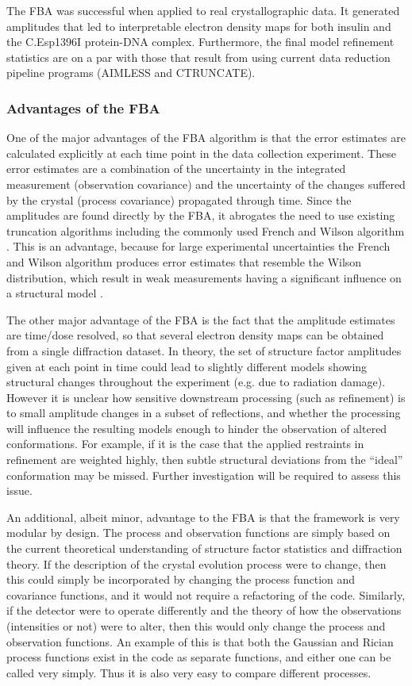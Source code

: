 The FBA was successful when applied to real crystallographic data.
It generated amplitudes that led to interpretable electron density maps for both insulin and the C.Esp1396I protein-DNA complex.
Furthermore, the final model refinement statistics are on a par with those that result from using current data reduction pipeline programs (AIMLESS and CTRUNCATE).

\subsubsection{Advantages of the FBA}
\label{subs:Advantages of the FBA}
One of the major advantages of the FBA algorithm is that the error estimates are calculated explicitly at each time point in the data collection experiment.
These error estimates are a combination of the uncertainty in the integrated measurement (observation covariance) and the uncertainty of the changes suffered by the crystal (process covariance) propagated through time.
Since the amplitudes are found directly by the FBA, it abrogates the need to use existing truncation algorithms including the commonly used French and Wilson algorithm \cite{french1978treatment}.
This is an advantage, because for large experimental uncertainties the French and Wilson algorithm produces error estimates that resemble the Wilson distribution, which result in weak measurements having a significant influence on a structural model \cite{read2015log}.

The other major advantage of the FBA is the fact that the amplitude estimates are time/dose resolved, so that several electron density maps can be obtained from a single diffraction dataset.
In theory, the set of structure factor amplitudes given at each point in time could lead to slightly different models showing structural changes throughout the experiment (e.g. due to radiation damage).
However it is unclear how sensitive downstream processing (such as refinement) is to small amplitude changes in a subset of reflections, and whether the processing will influence the resulting models enough to hinder the observation of altered conformations.
For example, if it is the case that the applied restraints in refinement are weighted highly, then subtle structural deviations from the ``ideal'' conformation may be missed.
Further investigation will be required to assess this issue.

An additional, albeit minor, advantage to the FBA is that the framework is very modular by design.
The process and observation functions are simply based on the current theoretical understanding of structure factor statistics and diffraction theory.
If the description of the crystal evolution process were to change, then this could simply be incorporated by changing the process function and covariance functions, and it would not require a refactoring of the code.
Similarly, if the detector were to operate differently and the theory of how the observations (intensities or not) were to alter, then this would only change the process and observation functions.
An example of this is that both the Gaussian and Rician process functions exist in the code as separate functions, and either one can be called very simply.
Thus it is also very easy to compare different processes.

